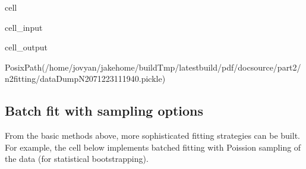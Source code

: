 \documentclass[letterpaper,table,10pt,english]{jupyterBook}
\begin{document}
\begin{sphinxuseclass}{cell}\begin{sphinxVerbatimInput}

\begin{sphinxuseclass}{cell_input}
\begin{sphinxVerbatim}[commandchars=\\\{\}]
    


     
\end{sphinxVerbatim}

\end{sphinxuseclass}\end{sphinxVerbatimInput}
\begin{sphinxVerbatimOutput}

\begin{sphinxuseclass}{cell_output}
\begin{sphinxVerbatim}[commandchars=\\\{\}]
PosixPath(\PYGZsq{}/home/jovyan/jake\PYGZhy{}home/buildTmp/\PYGZus{}latest\PYGZus{}build/pdf/doc\PYGZhy{}source/part2/n2fitting/dataDump\PYGZus{}N2\PYGZus{}071223\PYGZus{}11\PYGZhy{}19\PYGZhy{}40.pickle\PYGZsq{})
\end{sphinxVerbatim}

\end{sphinxuseclass}\end{sphinxVerbatimOutput}

\end{sphinxuseclass}

\subsection{Batch fit with sampling options}
\label{\detokenize{part2/basic_fitting_numerics_intro_260723:batch-fit-with-sampling-options}}
\sphinxAtStartPar
From the basic methods above, more sophisticated fitting strategies can be built. For example, the cell below implements batched fitting with Poission sampling of the data (for statistical bootstrapping).
\end{document}
